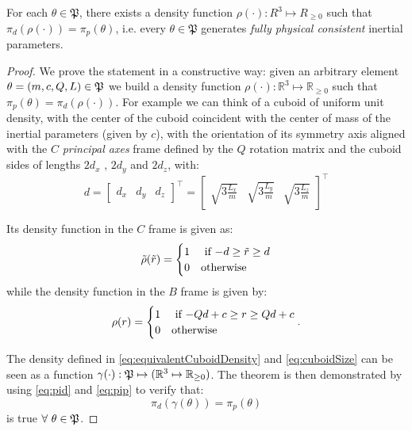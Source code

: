 \begin{theorem}
\label{thm:mainTheorem}
For each $\theta \in \mathfrak{P}$, there exists a density function $\rho(\cdot) : R^3 \mapsto R_{\geq 0}$ such that $\pi_d(\rho(\cdot)) = \pi_p(\theta)$, i.e. every  $\theta \in \mathfrak{P}$ generates \emph{fully physical consistent} inertial parameters.
\end{theorem}
\begin{proof}
\label{proof:mainTheorem}
We prove the statement in a constructive way: given an arbitrary element $\theta = (m,c,Q,L) \in \mathfrak{P}$ we build a density function $\rho(\cdot): \mathbb{R}^3 \mapsto \mathbb{R}_{\geq 0}$ such that $\pi_p(\theta) = \pi_d(\rho(\cdot))$. 
For example we can think of a cuboid of uniform unit density, with the center of the cuboid coincident with the center of mass of the inertial parameters (given by $c$), with the orientation of its symmetry axis aligned with the $C$ \emph{principal axes} frame defined by the $Q$ rotation matrix and the cuboid sides of lengths $2 d_x$ , $2 d_y$ and $2 d_z$, with:
\begin{equation}
\label{eq:cuboidSize}
    d = 
    \begin{bmatrix}
    d_x &
    d_y &
    d_z 
    \end{bmatrix}^{\top}
    = 
    \begin{bmatrix}
    \sqrt{3 \frac{L_x}{m}} &
    \sqrt{3 \frac{L_y}{m}} &
    \sqrt{3 \frac{L_z}{m}} 
    \end{bmatrix}^{\top}
\end{equation}


Its density function in the $C$ frame is given as:
\begin{equation*}
    \tilde{\rho}(\tilde{r}) = 
  \begin{cases} 
      \hfill 1 \hfill & \text{ if $-d \geq \tilde{r} \geq d$} \\
      \hfill 0 \hfill & \text{otherwise} \\
  \end{cases}
\end{equation*}
while the density function in the $B$ frame is given by:
\begin{equation}
  \label{eq:equivalentCuboidDensity}
    {\rho}({r}) = 
  \begin{cases} 
      \hfill 1 \hfill & \text{ if $-Qd+c \geq {r} \geq Qd+c$} \\
      \hfill 0 \hfill & \text{otherwise} \\
  \end{cases}.
\end{equation}

The density defined in \eqref{eq:equivalentCuboidDensity} and \eqref{eq:cuboidSize} can be seen as a function $\gamma(\cdot) : \mathfrak{P} \mapsto (\mathbb{R}^3 \mapsto \mathbb{R}_{\geq 0})$. The theorem is then demonstrated by using \eqref{eq:pid} and \eqref{eq:pip} to verify that:
$$
\pi_d(\gamma(\theta)) = \pi_p(\theta)
$$
is true $\forall~\theta \in \mathfrak{P}$.
\end{proof}

